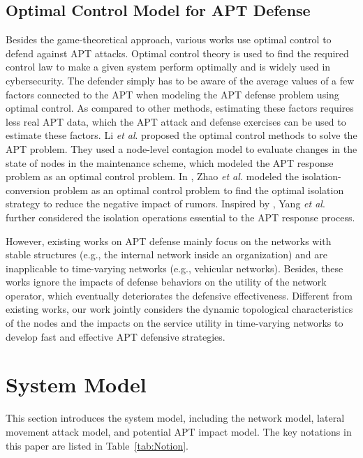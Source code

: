 \documentclass[lettersize,journal]{IEEEtran}
\begin{document}
\subsection{Optimal Control Model for APT Defense} 
Besides the game-theoretical approach, various works use optimal control to defend against APT attacks. Optimal control theory is used to find the required control law to make a given system perform optimally and is widely used in cybersecurity. The defender simply has to be aware of the average values of a few factors connected to the APT when modeling the APT defense problem using optimal control. As compared to other methods, estimating these factors requires less real APT data, which the APT attack and defense exercises \cite{diogenes2018cybersecurity} can be used to estimate these factors. Li \emph{et al}. proposed \cite{li2018defending} the optimal control methods to solve the APT problem. They used a node-level contagion model to evaluate changes in the state of nodes in the maintenance scheme, which modeled the APT response problem as an optimal control problem. In \cite{zhao2019minimizing}, Zhao \emph{et al.} modeled the isolation-conversion problem as an optimal control problem to find the optimal isolation strategy to reduce the negative impact of rumors. Inspired by \cite{zhao2019minimizing}, Yang \emph{et al}. \cite{yangEffectiveQuarantineRecovery2021} further considered the isolation operations essential to the APT response process. \par
However, existing works on APT defense mainly focus on the networks with stable structures (e.g., the internal network inside an organization) and are inapplicable to time-varying networks (e.g., vehicular networks). Besides, these works ignore the impacts of defense behaviors on the utility of the network operator, which eventually deteriorates the defensive effectiveness. Different from existing works, our work jointly considers the dynamic topological characteristics of the nodes and the impacts on the service utility in time-varying networks to develop fast and effective APT defensive strategies.



\section{System Model}
This section introduces the system model, including the network model, lateral movement attack model, and potential APT impact model. The key notations in this paper are listed in Table~\ref{tab:Notion}.
\end{document}
